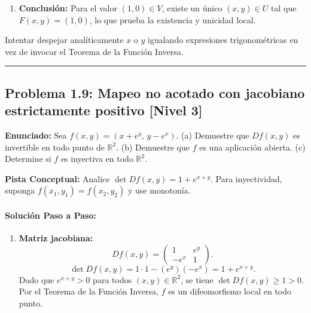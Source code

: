 \documentclass[11pt,a4paper]{article}
\begin{document}
\begin{enumerate}[label=\textbf{\arabic*.}]
\item \textbf{Conclusión:} Para el valor $(1,0) \in V$, existe un único $(x,y) \in U$ tal que $F(x,y) = (1,0)$, lo que prueba la existencia y unicidad local.
\end{enumerate}

\begin{trapbox}
Intentar despejar analíticamente $x$ o $y$ igualando expresiones trigonométricas en vez de invocar el Teorema de la Función Inversa.
\end{trapbox}

\vspace{0.5cm}
\hrule
\vspace{0.5cm}

\subsection*{Problema 1.9: Mapeo no acotado con jacobiano estrictamente positivo \hfill \color{primaryblue}\small[Nivel 3]}

\begin{tcolorbox}[colback=white,colframe=gray!40,arc=1mm,boxrule=0.5pt,left=3mm,right=3mm,top=2mm,bottom=2mm]
\textbf{Enunciado:} Sea $f(x,y) = (x + e^y, \, y - e^x)$. (a) Demuestre que $Df(x,y)$ es invertible en todo punto de $\mathbb{R}^2$. (b) Demuestre que $f$ es una aplicación abierta. (c) Determine si $f$ es inyectiva en todo $\mathbb{R}^2$.
\end{tcolorbox}

\begin{tcolorbox}[colback=yellow!4,colframe=accentamber!70,arc=1mm,boxrule=0.5pt,left=3mm,right=3mm,top=1.5mm,bottom=1.5mm]
\textbf{Pista Conceptual:} Analice $\det Df(x,y) = 1 + e^{x+y}$. Para inyectividad, suponga $f(x_1, y_1) = f(x_2, y_2)$ y use monotonía.
\end{tcolorbox}

\paragraph{Solución Paso a Paso:}\par
\begin{enumerate}[label=\textbf{\arabic*.}]
\item \textbf{Matriz jacobiana:}
\begin{equation*}
Df(x,y) = \begin{pmatrix} 1 & e^y \\ -e^x & 1 \end{pmatrix}.
\end{equation*}
\begin{equation*}
\det Df(x,y) = 1\cdot 1 - (e^y)(-e^x) = 1 + e^{x+y}.
\end{equation*}
Dado que $e^{x+y} > 0$ para todos $(x,y) \in \mathbb{R}^2$, se tiene $\det Df(x,y) \ge 1 > 0$. Por el Teorema de la Función Inversa, $f$ es un difeomorfismo local en todo punto.
\end{enumerate}
\end{document}
